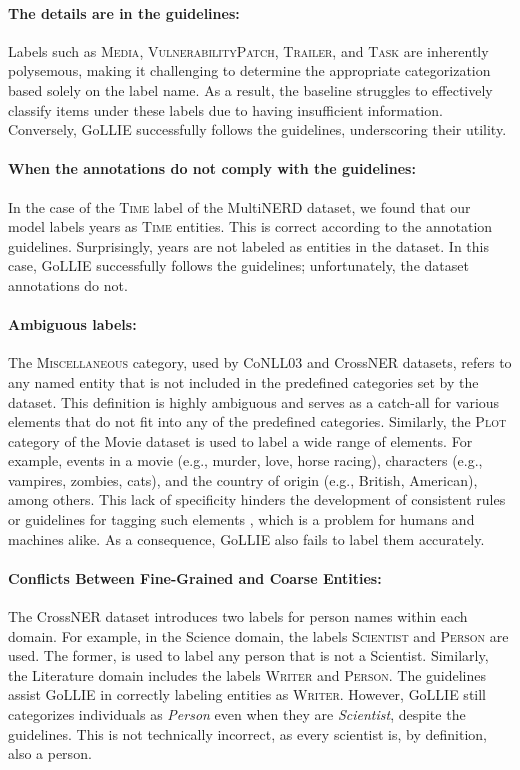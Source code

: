 \documentclass{article} \usepackage{iclr2024_conference,times}
\begin{document}
\paragraph{The details are in the guidelines:} Labels such as \textsc{Media}, \textsc{VulnerabilityPatch}, \textsc{Trailer}, and \textsc{Task} are inherently polysemous, making it challenging to determine the appropriate categorization based solely on the label name. As a result, the baseline struggles to effectively classify items under these labels due to having insufficient information. Conversely, GoLLIE successfully follows the guidelines, underscoring their utility.

\paragraph{When the annotations do not comply with the guidelines:} In the case of the \textsc{Time} label of the MultiNERD dataset, we found that our model labels years as \textsc{Time} entities. This is correct according to the annotation guidelines. Surprisingly, years are not labeled as entities in the dataset. In this case, GoLLIE successfully follows the guidelines; unfortunately, the dataset annotations do not.

\paragraph{Ambiguous labels:} The \textsc{Miscellaneous} category, used by CoNLL03 and CrossNER datasets, refers to any named entity that is not included in the predefined categories set by the dataset. This definition is highly ambiguous and serves as a catch-all for various elements that do not fit into any of the predefined categories. Similarly,  the \textsc{Plot} category of the Movie dataset is used to label a wide range of elements. For example, events in a movie (e.g., murder, love, horse racing), characters (e.g., vampires, zombies, cats), and the country of origin (e.g., British, American), among others. This lack of specificity hinders the development of consistent rules or guidelines for tagging such elements \citep{ratinov-roth-2009-design}, which is a problem for humans and machines alike. As a consequence, GoLLIE also fails to label them accurately. 


\paragraph{Conflicts Between Fine-Grained and Coarse Entities:} The CrossNER dataset introduces two labels for person names within each domain. For example, in the Science domain, the labels \textsc{Scientist} and \textsc{Person} are used. The former, is used to label any person that is not a Scientist. Similarly, the Literature domain includes the labels \textsc{Writer} and \textsc{Person}. The guidelines assist GoLLIE in correctly labeling entities as \textsc{Writer}. However, GoLLIE still categorizes individuals as \textit{Person} even when they are \textit{Scientist}, despite the guidelines. This is not technically incorrect, as every scientist is, by definition, also a person. 
\end{document}
